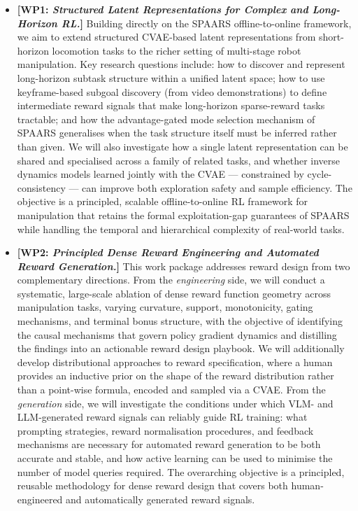 \documentclass[11pt,a4paper]{article}
\begin{document}
\begin{itemize}[leftmargin=1.5em, itemsep=6pt]

\item \textbf{[WP1: \textit{Structured Latent Representations for Complex and
Long-Horizon RL.}]}
  Building directly on the SPAARS offline-to-online framework, we aim to extend
  structured CVAE-based latent representations from short-horizon locomotion tasks
  to the richer setting of multi-stage robot manipulation.
  Key research questions include: how to discover and represent long-horizon subtask
  structure within a unified latent space; how to use keyframe-based subgoal discovery
  (from video demonstrations) to define intermediate reward signals that make
  long-horizon sparse-reward tasks tractable; and how the advantage-gated mode selection
  mechanism of SPAARS generalises when the task structure itself must be inferred rather
  than given.
  We will also investigate how a single latent representation can be shared and
  specialised across a family of related tasks, and whether inverse dynamics models
  learned jointly with the CVAE --- constrained by cycle-consistency --- can improve
  both exploration safety and sample efficiency.
  The objective is a principled, scalable offline-to-online RL framework for manipulation
  that retains the formal exploitation-gap guarantees of SPAARS while handling the
  temporal and hierarchical complexity of real-world tasks.

\item \textbf{[WP2: \textit{Principled Dense Reward Engineering and Automated
Reward Generation.}]}
  This work package addresses reward design from two complementary directions.
  From the \emph{engineering} side, we will conduct a systematic, large-scale ablation
  of dense reward function geometry across manipulation tasks, varying curvature,
  support, monotonicity, gating mechanisms, and terminal bonus structure, with the
  objective of identifying the causal mechanisms that govern policy gradient dynamics
  and distilling the findings into an actionable reward design playbook.
  We will additionally develop distributional approaches to reward specification,
  where a human provides an inductive prior on the shape of the reward distribution
  rather than a point-wise formula, encoded and sampled via a CVAE.
  From the \emph{generation} side, we will investigate the conditions under which
  VLM- and LLM-generated reward signals can reliably guide RL training:
  what prompting strategies, reward normalisation procedures, and feedback mechanisms
  are necessary for automated reward generation to be both accurate and stable,
  and how active learning can be used to minimise the number of model queries required.
  The overarching objective is a principled, reusable methodology for dense reward
  design that covers both human-engineered and automatically generated reward signals.


\end{itemize}
\end{document}
